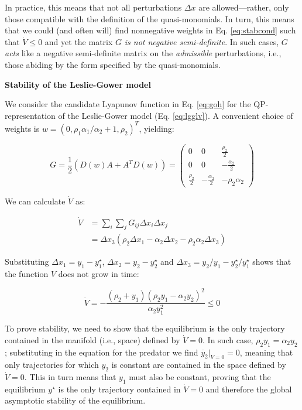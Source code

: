 \documentclass{article}
\begin{document}
In practice, this means that not all perturbations \(\Delta x\) are
allowed---rather, only those compatible with the definition of the
quasi-monomials. In turn, this means that we could (and often will) find
nonnegative weights in Eq. \ref{eq:stabcond} such that
\(\dot{V} \leq 0\) and yet the matrix \(G\) \emph{is not negative
semi-definite}. In such cases, \(G\) \emph{acts} like a negative
semi-definite matrix on the \emph{admissible} perturbations, i.e., those
abiding by the form specified by the quasi-monomials.

\begin{cb}
\textbf{Stability of the Leslie-Gower model}

We consider the candidate Lyapunov function in Eq. \ref{eq:goh} for the QP-representation of the Leslie-Gower model (Eq. \ref{eq:lgglv}). A convenient choice of weights is $w = (0, \rho_1 \alpha_1 / \alpha_2 + 1, \rho_2)^T$, yielding:

\begin{equation}
G =\frac{1}{2} (D(w)A + A^T D(w)) =
\begin{pmatrix}
0 & 0 & \frac{\rho_2}{2} \\
0 & 0 & -\frac{\alpha_2}{2} \\
\frac{\rho_2}{2} & -\frac{\alpha_2}{2} & -\rho_2 \alpha_2
\end{pmatrix}
\end{equation}

We can calculate $\dot{V}$ as:

\begin{equation}
\begin{aligned}
\dot{V} &= \sum_i \sum_j G_{ij} \Delta x_i \Delta x_j\\
&= \Delta x_3 (\rho_2 \Delta x_1 - \alpha_2 \Delta x_2 - \rho_2 \alpha_2 \Delta x_3)
\end{aligned}
\end{equation}

Substituting $\Delta x_1 = y_1 - y_1^\star$, $\Delta x_2 = y_2 - y_2^\star$ and $\Delta x_3 = y_2/y_1 - y_2^\star / y_1^\star$ shows that the function $V$ does not grow in time:

\begin{equation}
\dot{V} = -\frac{(\rho_2 + y_1) (\rho_2 y_1 - \alpha_2 y_2)^2}{\alpha_2 y_1^2} \leq 0
\end{equation}

To prove stability, we need to show that the equilibrium is the only trajectory contained in the manifold (i.e., space) defined by $\dot{V} = 0$. In such case, $\rho_2 y_1 = \alpha_2 y_2$; substituting in the equation for the predator we find $\dot{y_2}|_{\dot{V} = 0} = 0$, meaning that only trajectories for which $y_2$ is constant are contained in the space defined by $\dot{V} = 0$. This in turn means that $y_1$ must also be constant, proving that the equilibrium $y^\star$ is the only trajectory contained in $\dot{V} = 0$ and therefore the global asymptotic stability of the equilibrium.
\end{cb}
\end{document}
